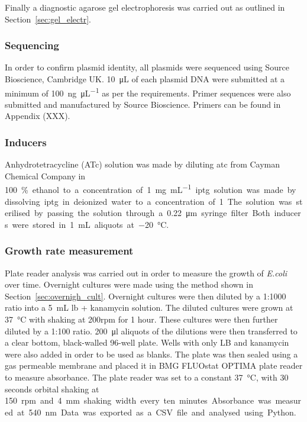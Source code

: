 Finally a diagnostic agarose gel electrophoresis was carried out as outlined in Section~\ref{sec:gel_electr}.

\subsubsection{Sequencing}
In order to confirm plasmid identity, all plasmids were sequenced using Source Bioscience, Cambridge UK. \SI{10}{\micro\liter}  of each plasmid DNA were submitted at a minimum of \SI{100}{\nano\gram\per\micro\liter} as per the requirements. Primer sequences were also submitted and manufactured by Source Bioscience. Primers can be found in Appendix (XXX). 

\subsubsection{Inducers}

Anhydrotetracycline (ATc) solution was made by diluting \acrshort{atc} from Cayman Chemical Company in \SI{100}\% ethanol to a concentration of \SI{1}{\milli\gram\per\milli\liter}. \acrfull{iptg} solution was made by dissolving \acrshort{iptg} in deionized water to a concentration of \SI{1}{\molar}. The solution was sterilised by passing the solution through a \SI{0.22}{\micro\meter} syringe filter. Both inducers were stored in \SI{1}{\milli\liter} aliquots at \SI{-20}{\celsius}. 


\subsubsection{Growth rate measurement}
\label{sec:growth_meth}
Plate reader analysis was carried out in order to measure the growth of \textit{E.coli} over time. Overnight cultures were made using the method shown in Section~\ref{sec:overnigh_cult}. Overnight cultures were then diluted by a 1:1000 ratio into a \SI{5}{\milli\liter} \acrshort{lb} + kanamycin solution. The diluted cultures were grown at \SI{37}{\celsius} with shaking at 200rpm for 1 hour. These cultures were then further diluted by a 1:100 ratio. \SI{200}{\ul} aliquots of the dilutions were then transferred to a clear bottom, black-walled 96-well plate. Wells with only LB and kanamycin were also added in order to be used as blanks. The plate was then sealed using a gas permeable membrane and placed it in BMG FLUOstat OPTIMA plate reader to measure absorbance. The plate reader was set to a constant \SI{37}{\celsius}, with 30 seconds orbital shaking at \SI{150}rpm and \SI{4}{\milli\metre} shaking width every ten minutes. Absorbance was measured at \SI{540}{\nano\meter}. Data was exported as a CSV file and analysed using Python. 

